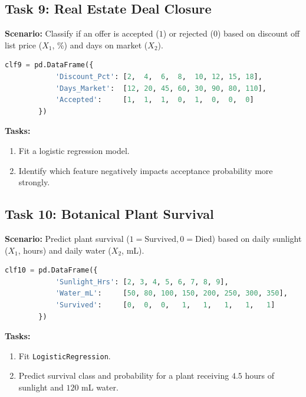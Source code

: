 \documentclass[11pt,a4paper]{article}
\begin{document}
	\subsection{Task 9: Real Estate Deal Closure}
	\textbf{Scenario:} Classify if an offer is accepted ($1$) or rejected ($0$) based on discount off list price ($X_1$, \%) and days on market ($X_2$).
	\begin{lstlisting}[language=Python]
		clf9 = pd.DataFrame({
			'Discount_Pct': [2,  4,  6,  8,  10, 12, 15, 18],
			'Days_Market':  [12, 20, 45, 60, 30, 90, 80, 110],
			'Accepted':     [1,  1,  1,  0,  1,  0,  0,  0]
		})
	\end{lstlisting}
	\textbf{Tasks:}
	\begin{enumerate}
		\item Fit a logistic regression model.
		\item Identify which feature negatively impacts acceptance probability more strongly.
	\end{enumerate}
	
	\subsection{Task 10: Botanical Plant Survival}
	\textbf{Scenario:} Predict plant survival ($1 = \text{Survived}, 0 = \text{Died}$) based on daily sunlight ($X_1$, hours) and daily water ($X_2$, mL).
	\begin{lstlisting}[language=Python]
		clf10 = pd.DataFrame({
			'Sunlight_Hrs': [2, 3, 4, 5, 6, 7, 8, 9],
			'Water_mL':     [50, 80, 100, 150, 200, 250, 300, 350],
			'Survived':     [0,  0,  0,   1,   1,   1,   1,   1]
		})
	\end{lstlisting}
	\textbf{Tasks:}
	\begin{enumerate}
		\item Fit \texttt{LogisticRegression}.
		\item Predict survival class and probability for a plant receiving $4.5$ hours of sunlight and $120$ mL water.
	\end{enumerate}
	
\end{document}
